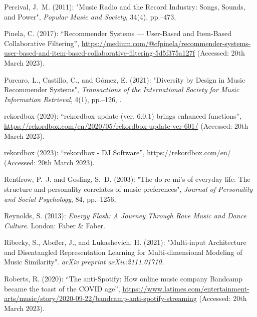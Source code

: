 \documentclass[11pt,titlepage,oneside]{book}
\begin{document}
\begin{thebibliography}{97}
	Percival, J.~M. (2011): "Music {Radio} and the {Record} {Industry}:
		{Songs}, {Sounds}, and {Power}", \textit{Popular Music and Society}, 34(4),
	pp.--473, 
	
	Pinela, C. (2017): \enquote{Recommender {Systems} — {User}-{Based} and
		{Item}-{Based} {Collaborative} {Filtering}},
	\urlprefix\url{https://medium.com/@cfpinela/recommender-systems-user-based-and-item-based-collaborative-filtering-5d5f375a127f} (Accessed: 20th March 2023).
	
	Porcaro, L., Castillo, C., and Gómez, E. (2021): "Diversity by
		{Design} in {Music} {Recommender} {Systems}", \textit{Transactions of the
		International Society for Music Information Retrieval}, 4(1),
	pp.--126, .
	
	rekordbox (2020): \enquote{rekordbox update (ver. 6.0.1) brings enhanced
		functions},
	\urlprefix\url{https://rekordbox.com/en/2020/05/rekordbox-update-ver-601/} (Accessed: 20th March 2023).
	
	rekordbox (2023): \enquote{rekordbox - {DJ} {Software}},
	\urlprefix\url{https://rekordbox.com/en/} (Accessed: 20th March 2023).
	
	Rentfrow, P.~J. and Gosling, S.~D. (2003): "The do re mi's of everyday
		life: {The} structure and personality correlates of music preferences",
	\textit{Journal of Personality and Social Psychology}, 84, pp.--1256, 
	
	Reynolds, S. (2013): \textit{Energy {Flash}: {A} {Journey} {Through} {Rave}
		{Music} and {Dance} {Culture}}. London: Faber \& Faber.
	
	Ribecky, S., Abeßer, J., and Lukashevich, H. (2021): "Multi-input
		{Architecture} and {Disentangled} {Representation} {Learning} for
		{Multi}-dimensional {Modeling} of {Music} {Similarity}". \textit{arXiv preprint arXiv:2111.01710.}

	Roberts, R. (2020): \enquote{The anti-{Spotify}: {How} online music company
		{Bandcamp} became the toast of the {COVID} age},
	\urlprefix\url{https://www.latimes.com/entertainment-arts/music/story/2020-09-22/bandcamp-anti-spotify-streaming} (Accessed: 20th March 2023).


\end{thebibliography}
\end{document}
